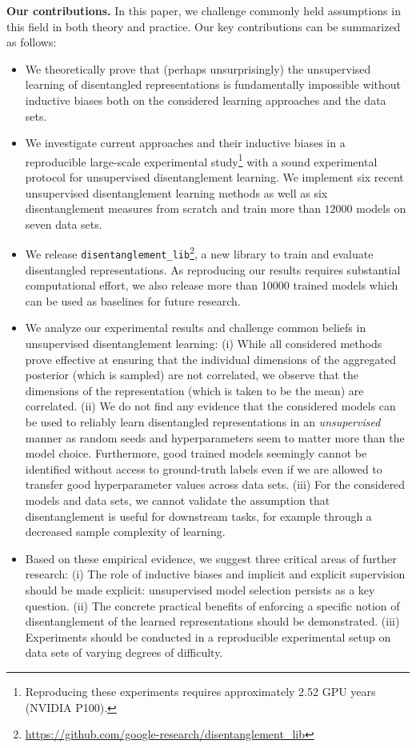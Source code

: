 \documentclass{article}
\begin{document}
\textbf{Our contributions.}
In this paper, we challenge commonly held assumptions in this field in both theory and practice. 
Our key contributions can be summarized as follows:
\begin{itemize}[itemsep=2pt,topsep=3pt, leftmargin=10pt]
\item We theoretically prove that (perhaps unsurprisingly) the unsupervised learning of disentangled representations is fundamentally impossible without inductive biases both on the considered learning approaches and the data sets.
\item We investigate current approaches and their inductive biases in a reproducible large-scale experimental study\footnote{Reproducing these experiments requires approximately 2.52 GPU years (NVIDIA P100).} with a sound experimental protocol for unsupervised disentanglement learning. 
We implement six recent unsupervised disentanglement learning methods as well as six disentanglement measures from scratch and train more than $\num{12000}$ models on seven data sets. 
\item We release \texttt{disentanglement\_lib}\footnote{\url{https://github.com/google-research/disentanglement_lib}}, a new library to train and evaluate disentangled representations. As reproducing our results requires substantial computational effort, we also release more than \num{10000} trained models which can be used as baselines for future research.
\item We analyze our experimental results and challenge common beliefs in unsupervised disentanglement learning:
(i) While all considered methods prove effective at ensuring that the individual dimensions of the aggregated posterior (which is sampled) are not correlated, we observe that the dimensions of the representation (which is taken to be the mean) are correlated.
(ii) We do not find any evidence that the considered models can be used to reliably learn disentangled representations in an \emph{unsupervised} manner as random seeds and hyperparameters seem to matter more than the model choice. 
Furthermore, good trained models seemingly cannot be identified without access to ground-truth labels even if we are allowed to transfer good hyperparameter values across data sets. 
(iii) For the considered models and data sets, we cannot validate the assumption that disentanglement is useful for downstream tasks, for example through a decreased sample complexity of learning.
\item Based on these empirical evidence, we suggest three critical areas of further research:
(i) The role of inductive biases and implicit and explicit supervision should be made explicit: unsupervised model selection persists as a key question.
(ii) The concrete practical benefits of enforcing a specific notion of disentanglement of the learned representations should be demonstrated.
(iii) Experiments should be conducted in a reproducible experimental setup on data sets of varying degrees of difficulty.

\end{itemize}
\end{document}
